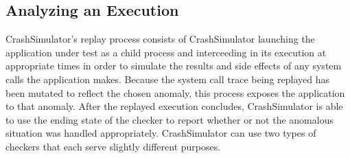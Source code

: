     \subsection{Analyzing an Execution}

    CrashSimulator's replay process consists of CrashSimulator launching the
    application under test as a child process and interceeding in its execution
    at appropriate times in order to simulate the results and side effects of any
    system calls the application makes.  Because the system call trace being
    replayed has been mutated to reflect the chosen anomaly, this process
    exposes the application to that anomaly. After the replayed execution
    concludes, CrashSimulator is able to use the ending state of the checker to
    report whether or not the anomalous situation was handled appropriately.
    CrashSimulator
    can use two types of checkers that each serve slightly different purposes.




